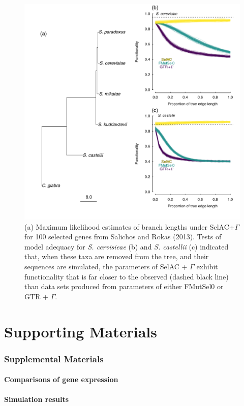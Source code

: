 \documentclass{article}
\begin{document}
\begin{figure}[H]
  \centering
  \includegraphics[width=0.9\linewidth]{FIGURE_3_Inferred_Tree_AND_Model_Adequacy.pdf}
  \caption{(a) Maximum likelihood estimates of branch lengths under SelAC+$\Gamma$ for 100 selected genes from Salichos and Rokas (2013).  
    Tests of model adequacy for \emph{S. cervisieae} (b) and \emph{S. castellii} (c) indicated that, when these taxa are removed from the tree, and their sequences are simulated, the parameters of SelAC + $\Gamma$ exhibit functionality that is far closer to the observed (dashed black line) than data sets produced from parameters of either FMutSel0 or GTR + $\Gamma$.
  } 
  \label{fig:TreeAndAdequacy}
\end{figure}


\clearpage

\setcounter{figure}{0}
\setcounter{table}{0}
\setcounter{page}{1}
\setcounter{section}{0}

\renewcommand{\thefigure}{S\arabic{figure}}
\renewcommand{\thetable}{S\arabic{table}}
\renewcommand{\thepage}{S\arabic{page}}
\renewcommand{\thesection}{\arabic{section}} %


\renewcommand{\appendixname}{Supporting Materials}
\renewcommand{\theequation}{S\arabic{equation}}
\setcounter{equation}{0}
\appendix
\part*{\appendixname}

\section*{Supplemental Materials}

\subsection*{Comparisons of gene expression}


\subsection*{Simulation results}
\end{document}
